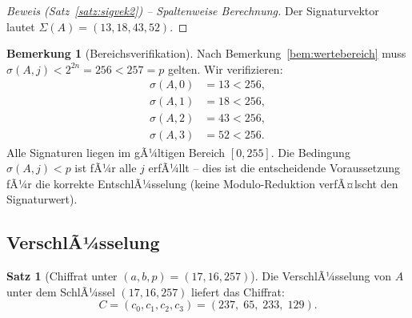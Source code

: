 ﻿\documentclass[a4paper,12pt]{scrreprt}
\theoremstyle{definition}
\newtheorem{bemerkung}{Bemerkung}[section]
\newtheorem{satz}{Satz}[section]
\begin{document}
\begin{proof}[Beweis (Satz~\ref{satz:sigvek2}) -- Spaltenweise Berechnung]
Der Signaturvektor lautet $\Sigma(A) = (13, 18, 43, 52)$.
\end{proof}

\begin{bemerkung}[Bereichsverifikation]
Nach Bemerkung~\ref{bem:wertebereich} muss $\sigma(A,j) < 2^{2n} = 256 < 257 = p$ gelten. Wir verifizieren:
\begin{align*}
\sigma(A,0) &= 13 < 256, \\
\sigma(A,1) &= 18 < 256, \\
\sigma(A,2) &= 43 < 256, \\
\sigma(A,3) &= 52 < 256.
\end{align*}
Alle Signaturen liegen im gÃ¼ltigen Bereich $[0, 255]$. Die Bedingung $\sigma(A,j) < p$ ist fÃ¼r alle $j$ erfÃ¼llt -- dies ist die entscheidende Voraussetzung fÃ¼r die korrekte EntschlÃ¼sselung (keine Modulo-Reduktion verfÃ¤lscht den Signaturwert).
\end{bemerkung}

\subsection{VerschlÃ¼sselung}

\begin{satz}[Chiffrat unter $(a, b, p) = (17, 16, 257)$]
\label{satz:chiffrat1716}
Die VerschlÃ¼sselung von $A$ unter dem SchlÃ¼ssel $(17, 16, 257)$ liefert das Chiffrat:
\[
C = (c_0, c_1, c_2, c_3) = (237,\; 65,\; 233,\; 129).
\]
\end{satz}
\end{document}
